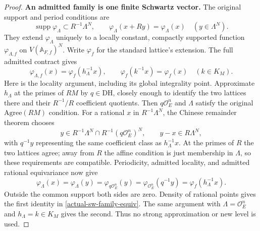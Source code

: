 \begin{proof}
\textbf{An admitted family is one finite Schwartz vector.}
The original support and period conditions are
\[
 \operatorname{supp}\varphi_\Lambda\subset R^{-1}\Lambda^N,
 \qquad \varphi_\Lambda(x+Ry)=\varphi_\Lambda(x)
                         \quad(y\in\Lambda^N).
\]
They extend $\varphi_\Lambda$ uniquely to a locally constant,
compactly supported function $\varphi_{\Lambda,f}$ on
$V(\mathbb A_{F,f})^N$. Write $\varphi_f$ for the standard
lattice's extension. The full admitted contract gives
\begin{equation}\label{actual-sw-family-equiv}
 \varphi_{\Lambda,f}(x)=\varphi_f(h_\Lambda^{-1}x),
 \qquad \varphi_f(k^{-1}x)=\varphi_f(x)\quad(k\in K_M).
\end{equation}
Here is the locality argument, including its global integrality
point. Approximate $h_\Lambda$ at the primes of $RM$ by
$q\in\mathrm{DH}$, closely enough to identify the two lattices
there and their $R^{-1}/R$ coefficient quotients. Then
$q\mathcal O_E^n$ and $\Lambda$ satisfy the original
$\mathrm{Agree}(RM)$ condition. For a rational $x$ in
$R^{-1}\Lambda^N$, the Chinese remainder theorem chooses
\[
 y\in R^{-1}\Lambda^N\cap R^{-1}(q\mathcal O_E^n)^N,
               \qquad y-x\in R\Lambda^N,
\]
with $q^{-1}y$ representing the same coefficient class as
$h_\Lambda^{-1}x$. At the primes of $R$ the two lattices agree;
away from $R$ the affine condition is just membership in
$\Lambda$, so these requirements are compatible. Periodicity,
admitted locality, and admitted rational equivariance now give
\[
 \varphi_\Lambda(x)=\varphi_\Lambda(y)
 =\varphi_{q\mathcal O_E^n}(y)
 =\varphi_{\mathcal O_E^n}(q^{-1}y)
 =\varphi_f(h_\Lambda^{-1}x).
\]
Outside the common support both sides are zero. Density of
rational points gives the first identity in
\eqref{actual-sw-family-equiv}. The same argument with
$\Lambda=\mathcal O_E^n$ and $h_\Lambda=k\in K_M$ gives the
second. Thus no strong approximation or new level is used.


\end{proof}
